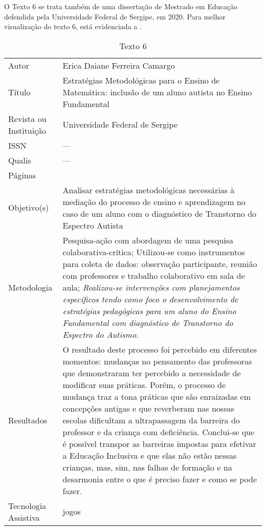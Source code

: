 \documentclass[portuguese]{textolivre}
\begin{document}
O Texto 6 se trata também de uma dissertação de Mestrado em Educação
defendida pela Universidade Federal de Sergipe, em 2020. Para melhor
visualização do texto 6, está evidenciada a .

\begin{footnotesize}
\begin{longtable}{
    >{\raggedright\arraybackslash}p{}
    >{\raggedright\arraybackslash}p{}
    }
\caption{Texto 6}
\label{tbl03}
\\
\toprule
Autor & Erica Daiane Ferreira Camargo \\
Título & Estratégias Metodológicas para o Ensino de Matemática: inclusão de um aluno autista no Ensino Fundamental \\
Revista ou Instituição & Universidade Federal de Sergipe \\
ISSN & --- \\
Qualis & --- \\
Páginas & 235 \\
Objetivo(s)	& Analisar estratégias metodológicas necessárias à mediação do processo de ensino e aprendizagem no caso de um aluno com o diagnóstico de Transtorno do Espectro Autista \\
Metodologia	& Pesquisa-ação com abordagem de uma pesquisa colaborativa-crítica;
Utilizou-se como instrumentos para coleta de dados: observação participante, reunião com professores e trabalho colaborativo em sala de aula; \newline
\emph{Realizou-se intervenções com planejamentos específicos tendo como foco o desenvolvimento de estratégias pedagógicas para um aluno do Ensino Fundamental com diagnóstico de Transtorno do Espectro do Autismo.} \\
Resultados & O resultado deste processo foi percebido em diferentes momentos: mudanças no pensamento das professoras que demonstraram ter percebido a necessidade de modificar suas práticas. Porém, o processo de mudança traz a tona práticas que são enraizadas em concepções antigas e que reverberam nas nossas escolas dificultam a ultrapassagem da barreira do professor e da criança com deficiência. \newline
Conclui-se que é possível transpor as barreiras impostas para efetivar a Educação Inclusiva e que elas não estão nessas crianças, mas, sim, nas falhas de formação e na desarmonia entre o que é preciso fazer e como se pode fazer. \\
Tecnologia Assistiva & jogos\newline

\end{longtable}
\end{footnotesize}
\end{document}
